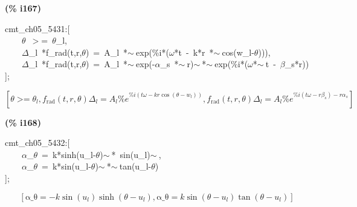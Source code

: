 \documentclass[fleqn]{article}
\begin{document}
\noindent
\begin{minipage}[t]{4.000000em}\color{red}\bfseries
(\% i167)	
\end{minipage}
\begin{minipage}[t]{\textwidth}\color{blue}
cmt\_ch05\_5431:[\\
\ \ \ \ \ensuremath{\theta}\ \ensuremath{>}=\ \ensuremath{\theta}\_l,\\
\ \ \ \ \ensuremath{\Delta}\_l\ *f\_rad(t,r,\ensuremath{\theta})\ =\ A\_l\ *\ensuremath{\sim\ }exp(\%i*(\ensuremath{\omega}*t\ -\ k*r\ *\ensuremath{\sim\ }cos(w\_l-\ensuremath{\theta}))),\\
\ \ \ \ \ensuremath{\Delta}\_l\ *f\_rad(t,r,\ensuremath{\theta})\ =\ A\_l\ *\ensuremath{\sim\ }exp(-\ensuremath{\alpha}\_s\ *\ensuremath{\sim\ }r)\ensuremath{\sim\ }*\ensuremath{\sim\ }exp(\%i*(\ensuremath{\omega}*\ensuremath{\sim\ }t\ -\ \ensuremath{\beta}\_s*r))\\
];
\end{minipage}
\[\displaystyle \tag{\% o167} 
\operatorname{[}\theta \operatorname{>  =}{{\theta }_l}\operatorname{,}{f_{\ensuremath{\mathrm{rad}}}}\left( t\operatorname{,}r\operatorname{,}\theta \right)  {{\Delta }_l}={A_l} {{\% e}^{\% i \left( t \omega -k r \cos{\left( \theta -{w_l}\right) }\right) }}\operatorname{,}{f_{\ensuremath{\mathrm{rad}}}}\left( t\operatorname{,}r\operatorname{,}\theta \right)  {{\Delta }_l}={A_l}{{\% e}^{\% i \left( t \omega -r {{\beta }_s}\right) -r {{\alpha }_s}}}\operatorname{]}\mbox{}
\]


\noindent
\begin{minipage}[t]{4.000000em}\color{red}\bfseries
(\% i168)	
\end{minipage}
\begin{minipage}[t]{\textwidth}\color{blue}
cmt\_ch05\_5432:[\\
\ \ \ \ \ensuremath{\alpha}\_\ensuremath{\theta}\ =\ k*sinh(u\_l-\ensuremath{\theta})\ensuremath{\sim\ }*\ sin(u\_l)\ensuremath{\sim\ },\ \\
\ \ \ \ \ensuremath{\alpha}\_\ensuremath{\theta}\ =\ k*sin(u\_l-\ensuremath{\theta})\ensuremath{\sim\ }*\ensuremath{\sim\ }tan(u\_l-\ensuremath{\theta})\\
];
\end{minipage}
\[\displaystyle \tag{\% o168} 
\left[ \ensuremath{\mathrm{\alpha \_ \theta }}=-k \sin{\left( {u_l}\right) } \sinh{\left( \theta -{u_l}\right) }\operatorname{,}\ensuremath{\mathrm{\alpha \_ \theta }}=k \sin{\left( \theta -{u_l}\right) } \tan{\left( \theta -{u_l}\right) }\right] \mbox{}
\]
\end{document}
